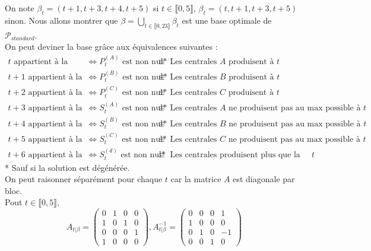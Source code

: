 \documentclass{article}
\begin{document}
On note $\beta_t = (t+1,t+3,t+4,t+5)$ si $t\in \llbracket 0,5 \rrbracket$, $\beta_t = (t,t+1,t+3,t+5)$ sinon. Nous allons montrer que $\beta=\underset{t\in\llbracket 0,23 \rrbracket}{\bigcup}\beta_t$ est une base optimale de $\mathcal{P}_{standard}$.\\
On peut deviner la base grâce aux équivalences suivantes : 
$$
\left.
    \begin{array}{ccc}
        t \text{ appartient à la base}& \Leftrightarrow P_t^{(A)} \text{ est non nul*} &\equiv \text{ Les centrales $A$ produisent à $t$}\\
        t+1 \text{ appartient à la base}& \Leftrightarrow P_t^{(B)} \text{ est non nul*} &\equiv \text{ Les centrales $B$ produisent à $t$}\\
        t+2 \text{ appartient à la base}& \Leftrightarrow P_t^{(C)} \text{ est non nul*} &\equiv \text{ Les centrales $C$ produisent à $t$}\\
        t+3 \text{ appartient à la base}& \Leftrightarrow S_t^{(A)} \text{ est non nul*} &\equiv \text{ Les centrales $A$ ne produisent pas au max possible à $t$}\\
        t+4 \text{ appartient à la base}& \Leftrightarrow S_t^{(B)} \text{ est non nul*} &\equiv \text{ Les centrales $B$ ne produisent pas au max possible à $t$}\\
        t+5 \text{ appartient à la base}& \Leftrightarrow S_t^{(C)} \text{ est non nul*} &\equiv \text{ Les centrales $C$ ne produisent pas au max possible à $t$}\\
        t+6 \text{ appartient à la base}& \Leftrightarrow S_t^{(d)} \text{ est non nul*} &\equiv \text{ Les centrales produisent plus que la demande à $t$}
    \end{array}
\right.
$$
* Sauf si la solution est dégénérée.\\[0.2cm]
On peut raisonner séparément pour chaque $t$ car la matrice $A$ est diagonale par bloc.\\
Pout $t \in \llbracket 0,5 \rrbracket$,\\
$$
A_{t|\beta} = 
\left(
\begin{array}{cccc}
    0 & 1 & 0 & 0 \\
    1 & 0 & 1 & 0 \\
    0 & 0 & 0 & 1 \\
    1 & 0 & 0 & 0 
\end{array}
\right)
,
A_{t|\beta}^{-1} = 
\left(
\begin{array}{cccc}
    0 & 0 & 0 & 1 \\
    1 & 0 & 0 & 0 \\
    0 & 1 & 0 & -1 \\
    0 & 0 & 1 & 0 
\end{array}
\right)
$$
\end{document}

